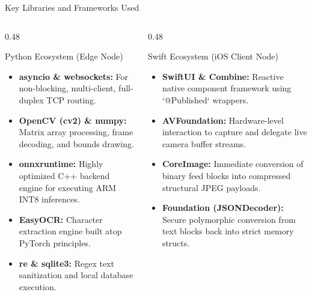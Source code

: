 \documentclass[aspectratio=169,11pt]{beamer}
\begin{document}
\begin{frame}{Key Libraries and Frameworks Used}
\begin{columns}
\begin{column}{0.48\textwidth}
\begin{block}{Python Ecosystem (Edge Node)}
\begin{itemize}
    \item \textbf{asyncio \& websockets:} For non-blocking, multi-client, full-duplex TCP routing.
    \item \textbf{OpenCV (cv2) \& numpy:} Matrix array processing, frame decoding, and bounds drawing.
    \item \textbf{onnxruntime:} Highly optimized C++ backend engine for executing ARM INT8 inferences.
    \item \textbf{EasyOCR:} Character extraction engine built atop PyTorch principles.
    \item \textbf{re \& sqlite3:} Regex text sanitization and local database execution.
\end{itemize}
\end{block}
\end{column}
\begin{column}{0.48\textwidth}
\begin{block}{Swift Ecosystem (iOS Client Node)}
\begin{itemize}
    \item \textbf{SwiftUI \& Combine:} Reactive native component framework using `@Published` wrappers.
    \item \textbf{AVFoundation:} Hardware-level interaction to capture and delegate live camera buffer streams.
    \item \textbf{CoreImage:} Immediate conversion of binary feed blocks into compressed structural JPEG payloads.
    \item \textbf{Foundation (JSONDecoder):} Secure polymorphic conversion from text blocks back into strict memory structs.
\end{itemize}
\end{block}
\end{column}
\end{columns}
\end{frame}
\end{document}
